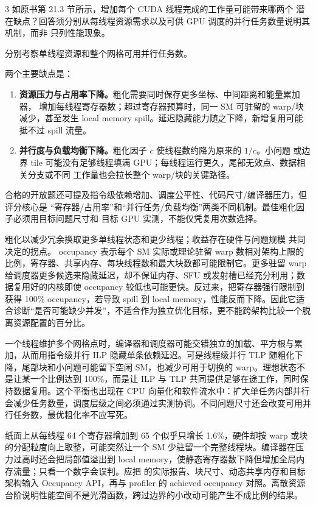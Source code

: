 \begin{solutionexercise}{3}
\problemheading 如原书第 21.3 节所示，增加每个 CUDA 线程完成的工作量可能带来哪两个
潜在缺点？回答须分别从每线程资源需求以及可供 GPU 调度的并行任务数量说明其机制，而非
只列性能现象。

\approachheading 分别考察单线程资源和整个网格可用并行任务数。

\answerheading 两个主要缺点是：
\begin{enumerate}
  \item \textbf{资源压力与占用率下降。}粗化需要同时保存更多坐标、中间距离和能量累加器，
  增加每线程寄存器数；超过寄存器预算时，同一 SM 可驻留的 warp/块减少，甚至发生 local
  memory spill。延迟隐藏能力随之下降，新增复用可能抵不过 spill 流量。
  \item \textbf{并行度与负载均衡下降。}粗化因子 $c$ 使线程数约降为原来的 $1/c$。小问题
  或边界 tile 可能没有足够线程填满 GPU；每线程运行更久，尾部无效点、数据相关分支或不同
  工作量也会拉长整个 warp/块的关键路径。
\end{enumerate}
合格的开放题还可提及指令级依赖增加、调度公平性、代码尺寸/编译器压力，但评分核心是
“寄存器/占用率”和“并行任务/负载均衡”两类不同机制。最佳粗化因子必须用目标问题尺寸和
目标 GPU 实测，不能仅凭复用次数选择。

\conclusionheading 粗化以减少冗余换取更多单线程状态和更少线程；收益存在硬件与问题规模
共同决定的拐点。
\discussionheading
{}
occupancy 表示每个 SM 实际或理论驻留 warp 数相对架构上限的比例，寄存器、共享内存、每块线程数和最大块数都可能限制它。更多驻留 warp 给调度器更多候选来隐藏延迟，却不保证内存、SFU 或发射槽已经充分利用；数据复用好的内核即使 occupancy 较低也可能更快。反过来，把寄存器强行限制到获得 100\% occupancy，若导致 spill 到 local memory，性能反而下降。因此它适合诊断“是否可能缺少并发”，不适合作为独立优化目标，更不能跨架构比较一个脱离资源配置的百分比。

一个线程维护多个网格点时，编译器和调度器可能交错独立的加载、平方根与累加，从而用指令级并行 ILP 隐藏单条依赖延迟。可是线程级并行 TLP 随粗化下降，尾部块和小问题可能留下空闲 SM，也减少可用于切换的 warp。理想状态不是让某一个比例达到 100\%，而是让 ILP 与 TLP 共同提供足够在途工作，同时保持数据复用。这个平衡也出现在 CPU 向量化和软件流水中：扩大单任务内部并行会减少任务数量，调度层级之间必须通过实测协调。不同问题尺寸还会改变可用并行任务数，最优粗化率不应写死。

纸面上从每线程 64 个寄存器增加到 65 个似乎只增长 1.6\%，硬件却按 warp 或块的分配粒度向上取整，可能突然让一个 SM 少驻留一个完整线程块。编译器在压力过高时还会把局部值溢出到 local memory，使静态寄存器数下降但增加全局内存流量；只看一个数字会误判。应把  的实际报告、块尺寸、动态共享内存和目标架构输入 Occupancy API，再与 profiler 的 achieved occupancy 对照。离散资源台阶说明性能空间不是光滑函数，跨过边界的小改动可能产生不成比例的结果。


\end{solutionexercise}
